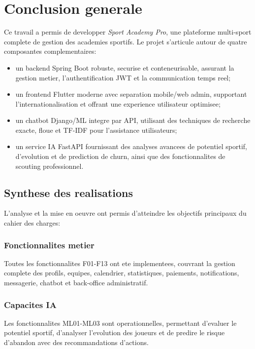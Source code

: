 \chapter{Conclusion generale}

Ce travail a permis de developper \textit{Sport Academy Pro}, une plateforme multi-sport complete de gestion des academies sportifs. Le projet s'articule autour de quatre composantes complementaires:
\begin{itemize}
  \item un backend Spring Boot robuste, securise et conteneurisable, assurant la gestion metier, l'authentification JWT et la communication temps reel;
  \item un frontend Flutter moderne avec separation mobile/web admin, supportant l'internationalisation et offrant une experience utilisateur optimisee;
  \item un chatbot Django/ML integre par API, utilisant des techniques de recherche exacte, floue et TF-IDF pour l'assistance utilisateurs;
  \item un service IA FastAPI fournissant des analyses avancees de potentiel sportif, d'evolution et de prediction de churn, ainsi que des fonctionnalites de scouting professionnel.
\end{itemize}

\section{Synthese des realisations}

L'analyse et la mise en oeuvre ont permis d'atteindre les objectifs principaux du cahier des charges:

\subsection*{Fonctionnalites metier}
Toutes les fonctionnalites F01-F13 ont ete implementees, couvrant la gestion complete des profils, equipes, calendrier, statistiques, paiements, notifications, messagerie, chatbot et back-office administratif.

\subsection*{Capacites IA}
Les fonctionnalites ML01-ML03 sont operationnelles, permettant d'evaluer le potentiel sportif, d'analyser l'evolution des joueurs et de predire le risque d'abandon avec des recommandations d'actions.

